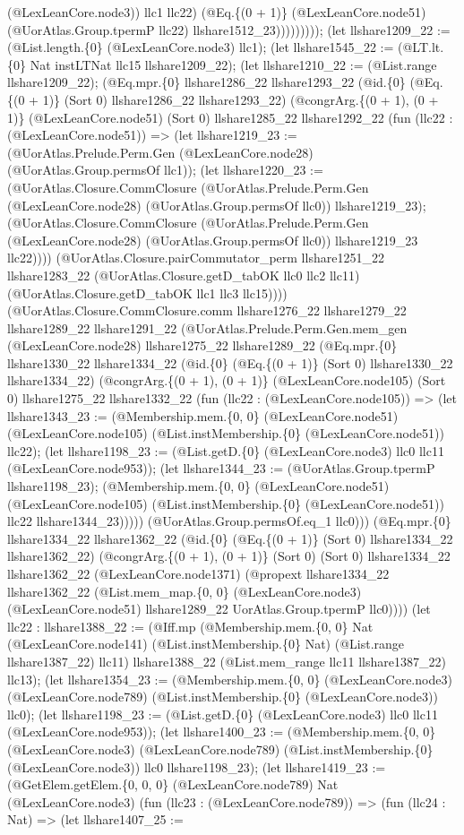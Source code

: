 \documentclass[11pt]{article}
\begin{document}
(@LexLeanCore.node3)) llc1 llc22) (@Eq.\{(0 + 1)\} (@LexLeanCore.node51) (@UorAtlas.Group.tpermP llc22) llshare1512\_23))))))))); (let llshare1209\_22 := (@List.length.\{0\} (@LexLeanCore.node3) llc1); (let llshare1545\_22 := (@LT.lt.\{0\} Nat instLTNat llc15 llshare1209\_22); (let llshare1210\_22 := (@List.range llshare1209\_22); (@Eq.mpr.\{0\} llshare1286\_22 llshare1293\_22 (@id.\{0\} (@Eq.\{(0 + 1)\} (Sort 0) llshare1286\_22 llshare1293\_22) (@congrArg.\{(0 + 1), (0 + 1)\} (@LexLeanCore.node51) (Sort 0) llshare1285\_22 llshare1292\_22 (fun (llc22 : (@LexLeanCore.node51)) => (let llshare1219\_23 := (@UorAtlas.Prelude.Perm.Gen (@LexLeanCore.node28) (@UorAtlas.Group.permsOf llc1)); (let llshare1220\_23 := (@UorAtlas.Closure.CommClosure (@UorAtlas.Prelude.Perm.Gen (@LexLeanCore.node28) (@UorAtlas.Group.permsOf llc0)) llshare1219\_23); (@UorAtlas.Closure.CommClosure (@UorAtlas.Prelude.Perm.Gen (@LexLeanCore.node28) (@UorAtlas.Group.permsOf llc0)) llshare1219\_23 llc22)))) (@UorAtlas.Closure.pairCommutator\_perm llshare1251\_22 llshare1283\_22 (@UorAtlas.Closure.getD\_tabOK llc0 llc2 llc11) (@UorAtlas.Closure.getD\_tabOK llc1 llc3 llc15)))) (@UorAtlas.Closure.CommClosure.comm llshare1276\_22 llshare1279\_22 llshare1289\_22 llshare1291\_22 (@UorAtlas.Prelude.Perm.Gen.mem\_gen (@LexLeanCore.node28) llshare1275\_22 llshare1289\_22 (@Eq.mpr.\{0\} llshare1330\_22 llshare1334\_22 (@id.\{0\} (@Eq.\{(0 + 1)\} (Sort 0) llshare1330\_22 llshare1334\_22) (@congrArg.\{(0 + 1), (0 + 1)\} (@LexLeanCore.node105) (Sort 0) llshare1275\_22 llshare1332\_22 (fun (llc22 : (@LexLeanCore.node105)) => (let llshare1343\_23 := (@Membership.mem.\{0, 0\} (@LexLeanCore.node51) (@LexLeanCore.node105) (@List.instMembership.\{0\} (@LexLeanCore.node51)) llc22); (let llshare1198\_23 := (@List.getD.\{0\} (@LexLeanCore.node3) llc0 llc11 (@LexLeanCore.node953)); (let llshare1344\_23 := (@UorAtlas.Group.tpermP llshare1198\_23); (@Membership.mem.\{0, 0\} (@LexLeanCore.node51) (@LexLeanCore.node105) (@List.instMembership.\{0\} (@LexLeanCore.node51)) llc22 llshare1344\_23))))) (@UorAtlas.Group.permsOf.eq\_1 llc0))) (@Eq.mpr.\{0\} llshare1334\_22 llshare1362\_22 (@id.\{0\} (@Eq.\{(0 + 1)\} (Sort 0) llshare1334\_22 llshare1362\_22) (@congrArg.\{(0 + 1), (0 + 1)\} (Sort 0) (Sort 0) llshare1334\_22 llshare1362\_22 (@LexLeanCore.node1371) (@propext llshare1334\_22 llshare1362\_22 (@List.mem\_map.\{0, 0\} (@LexLeanCore.node3) (@LexLeanCore.node51) llshare1289\_22 UorAtlas.Group.tpermP llc0)))) (let llc22 : llshare1388\_22 := (@Iff.mp (@Membership.mem.\{0, 0\} Nat (@LexLeanCore.node141) (@List.instMembership.\{0\} Nat) (@List.range llshare1387\_22) llc11) llshare1388\_22 (@List.mem\_range llc11 llshare1387\_22) llc13); (let llshare1354\_23 := (@Membership.mem.\{0, 0\} (@LexLeanCore.node3) (@LexLeanCore.node789) (@List.instMembership.\{0\} (@LexLeanCore.node3)) llc0); (let llshare1198\_23 := (@List.getD.\{0\} (@LexLeanCore.node3) llc0 llc11 (@LexLeanCore.node953)); (let llshare1400\_23 := (@Membership.mem.\{0, 0\} (@LexLeanCore.node3) (@LexLeanCore.node789) (@List.instMembership.\{0\} (@LexLeanCore.node3)) llc0 llshare1198\_23); (let llshare1419\_23 := (@GetElem.getElem.\{0, 0, 0\} (@LexLeanCore.node789) Nat (@LexLeanCore.node3) (fun (llc23 : (@LexLeanCore.node789)) => (fun (llc24 : Nat) => (let llshare1407\_25 := 
\end{document}
